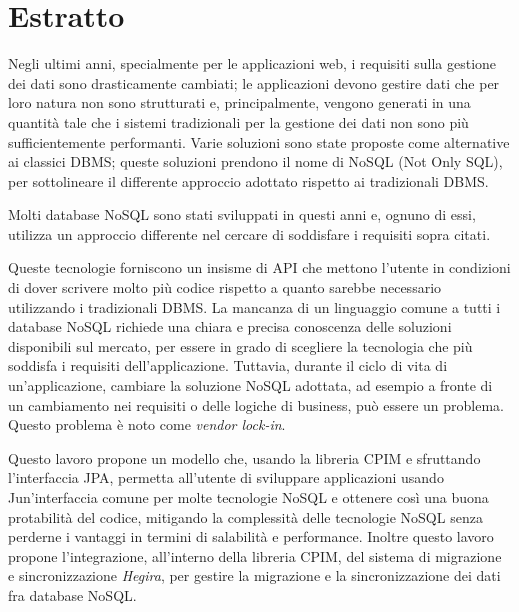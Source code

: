 \thispagestyle{empty}

\chapter*{Estratto}
Negli ultimi anni, specialmente per le applicazioni web, i requisiti sulla gestione dei dati sono drasticamente cambiati; le applicazioni devono gestire dati che per loro natura non sono strutturati e, principalmente, vengono generati in una quantit\`{a} tale che i sistemi tradizionali per la gestione dei dati non sono più sufficientemente performanti. Varie soluzioni sono state proposte come alternative ai classici DBMS; queste soluzioni prendono il nome di NoSQL (Not Only SQL), per sottolineare il differente approccio adottato rispetto ai tradizionali DBMS.

\noindent Molti database NoSQL sono stati sviluppati in questi anni e, ognuno di essi, utilizza un approccio differente nel cercare di soddisfare i requisiti sopra citati.

\noindent Queste tecnologie forniscono un insisme di API che mettono l'utente in condizioni di dover scrivere molto pi\`{u}  codice rispetto a quanto sarebbe necessario utilizzando i tradizionali DBMS. 
La mancanza di un linguaggio comune a tutti i database NoSQL richiede una chiara e precisa conoscenza delle soluzioni disponibili sul mercato, per essere in grado di scegliere la tecnologia che pi\`{u} soddisfa i requisiti dell'applicazione. Tuttavia, durante il ciclo di vita di un'applicazione, cambiare la soluzione NoSQL adottata, ad esempio a fronte di un cambiamento nei requisiti o delle logiche di business, pu\`{o} essere un problema. Questo problema \`{e} noto come \textit{vendor lock-in}.

\noindent Questo lavoro propone un modello che, usando la libreria CPIM e sfruttando l'interfaccia JPA, permetta all'utente di sviluppare applicazioni usando Jun'interfaccia comune per molte tecnologie NoSQL e ottenere cos\`{i} una buona protabilit\`{a} del codice, mitigando la complessit\`{a} delle tecnologie NoSQL senza perderne i vantaggi in termini di salabilit\`{a} e performance. Inoltre questo lavoro propone l'integrazione, all'interno della libreria CPIM, del sistema di migrazione e sincronizzazione \textit{Hegira}, per gestire la migrazione e la sincronizzazione dei dati fra database NoSQL.

